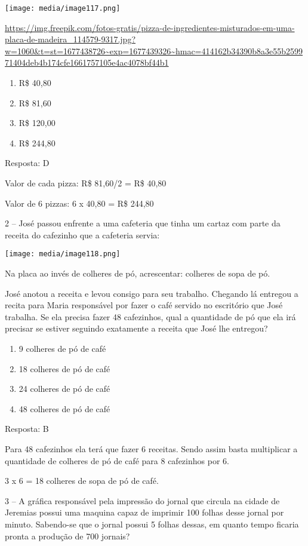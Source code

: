 \texttt{[image: media/image117.png]}

\url{https://img.freepik.com/fotos-gratis/pizza-de-ingredientes-misturados-em-uma-placa-de-madeira_114579-9317.jpg?w=1060\&t=st=1677438726~exp=1677439326~hmac=414162b34390b8a3e55b259971404deb4b174cfe1661757105e4ac4078bf44b1}

\begin{enumerate}
\def\labelenumi{\alph{enumi})}
\item
  R\$ 40,80
\item
  R\$ 81,60
\item
  R\$ 120,00
\item
  R\$ 244,80
\end{enumerate}

Resposta: D

Valor de cada pizza: R\$ 81,60/2 = R\$ 40,80

Valor de 6 pizzas: 6 x 40,80 = R\$ 244,80

2 -- José passou enfrente a uma cafeteria que tinha um cartaz com parte
da receita do cafezinho que a cafeteria servia:

\texttt{[image: media/image118.png]}

Na placa ao invés de colheres de pó, acrescentar: colheres de sopa de
pó.

José anotou a receita e levou consigo para seu trabalho. Chegando lá
entregou a recita para Maria responsável por fazer o café servido no
escritório que José trabalha. Se ela precisa fazer 48 cafezinhos, qual a
quantidade de pó que ela irá precisar se estiver seguindo exatamente a
receita que José lhe entregou?

\begin{enumerate}
\def\labelenumi{\alph{enumi})}
\item
  9 colheres de pó de café
\item
  18 colheres de pó de café
\item
  24 colheres de pó de café
\item
  48 colheres de pó de café
\end{enumerate}

Resposta: B

Para 48 cafezinhos ela terá que fazer 6 receitas. Sendo assim basta
multiplicar a quantidade de colheres de pó de café para 8 cafezinhos por
6.

3 x 6 = 18 colheres de sopa de pó de café.

3 -- A gráfica responsável pela impressão do jornal que circula na
cidade de Jeremias possui uma maquina capaz de imprimir 100 folhas desse
jornal por minuto. Sabendo-se que o jornal possui 5 folhas dessas, em
quanto tempo ficaria pronta a produção de 700 jornais?

